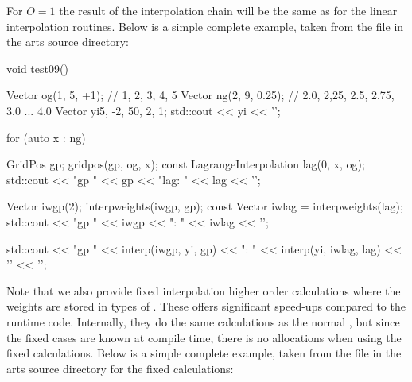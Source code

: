 For $O=1$ the result of the
interpolation chain will be the same as for the linear interpolation
routines. Below is a simple complete example, taken from
the file  in the arts source directory: 

\begin{code}
void test09() {
  Vector og(1, 5, +1);    // 1, 2, 3, 4, 5
  Vector ng(2, 9, 0.25);  // 2.0, 2,25, 2.5, 2.75, 3.0 ... 4.0
  Vector yi{5, -2, 50, 2, 1};
  std::cout << yi << '\n';

  for (auto x : ng) {
    GridPos gp;
    gridpos(gp, og, x);
    const LagrangeInterpolation lag(0, x, og);
    std::cout << "gp " << gp << "lag: " << lag << '\n';

    Vector iwgp(2);
    interpweights(iwgp, gp);
    const Vector iwlag = interpweights(lag);
    std::cout << "gp " << iwgp << "\nlag: " << iwlag << '\n';

    std::cout << "gp " << interp(iwgp, yi, gp)
              << "\nlag: " << interp(yi, iwlag, lag) << '\n'
              << '\n';
  }
}
\end{code}

Note that we also provide fixed interpolation higher order calculations where
the weights are stored in types of .
These offers significant speed-ups compared to the runtime code.  Internally,
they do the same calculations as the normal ,
but since the fixed cases are known at compile time, there is no allocations
when using the fixed calculations. Below is a simple complete example, taken from
the file  in the arts source directory for the fixed calculations: 

